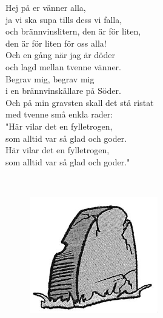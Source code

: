\documentclass[a6paper,10pt]{article}
\begin{document}
\setlength{\oddsidemargin}{-0.37in}
\begin{center}
\end{center}
\begin{lyrics}
Hej på er vänner alla, \\
ja vi ska supa tills dess vi falla, \\
och brännvinslitern, den är för liten, \\
den är för liten för oss alla! \\
\newline
Och en gång när jag är döder\\ 
och lagd mellan tvenne vänner. \\
Begrav mig, begrav mig \\
i en brännvinskällare på Söder. \\
\newline
Och på min gravsten skall det stå ristat \\
med tvenne små enkla rader: \\
"Här vilar det en fylletrogen, \\
som alltid var så glad och goder.\\ 
Här vilar det en fylletrogen, \\
som alltid var så glad och goder." 
\end{lyrics}
\vspace{35pt} \\
\begin{figure}[!h]
\centering
\includegraphics[width=0.5\textwidth]{gravsten.jpg}
\end{figure}
\end{document}
